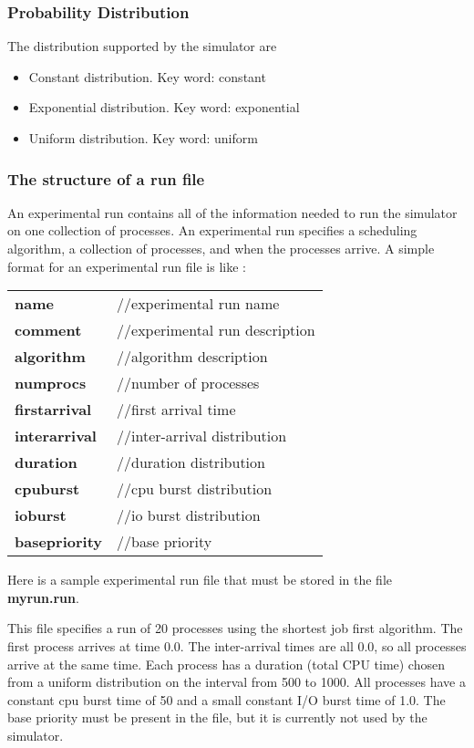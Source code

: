 \documentclass[16pt]{article}
\begin{document}
\subsubsection*{Probability Distribution}

The distribution supported by the simulator are

\begin{itemize}
\item Constant distribution. Key word: constant
\item Exponential distribution. Key word: exponential
\item Uniform distribution. Key word: uniform
\end{itemize}

\subsubsection*{The structure of a run file}

An experimental run contains all of the information needed to run the simulator on one
collection of processes. An experimental run specifies a scheduling algorithm, a
collection of processes, and when the processes arrive. A simple format for an
experimental run file is like :

\begin{tabular}{l l}
\textbf{name} & //experimental run name \\ 
\textbf{comment} & //experimental run description \\
\textbf{algorithm} & //algorithm description \\
\textbf{numprocs} & //number of processes \\
\textbf{firstarrival} & //first arrival time \\
\textbf{interarrival} & //inter-arrival distribution \\
\textbf{duration} & //duration distribution \\
\textbf{cpuburst} & //cpu burst distribution \\
\textbf{ioburst}  & //io burst distribution \\
\textbf{basepriority} & //base priority 
\end{tabular}


Here is a sample experimental run file that must be stored in the file \textbf{myrun.run}.



This file specifies a run of 20 processes using the shortest job first algorithm. The first
process arrives at time 0.0. The inter-arrival times are all 0.0, so all processes arrive at the
same time. Each process has a duration (total CPU time) chosen from a uniform
distribution on the interval from 500 to 1000. All processes have a constant cpu burst
time of 50 and a small constant I/O burst time of 1.0. The base priority must be present in
the file, but it is currently not used by the simulator.
\end{document}
